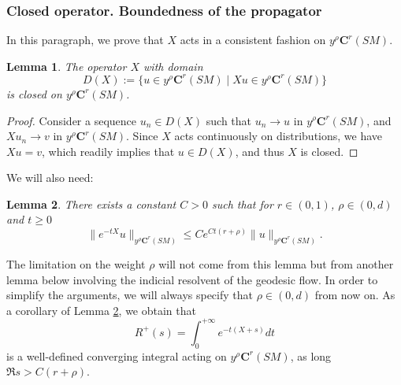 \documentclass[10pt]{amsart}
\newcommand{\bC}{\boldsymbol{C}}
\theoremstyle{plain}
\newtheorem{lemma}{Lemma}[section]
\theoremstyle{definition}
\begin{document}
\subsubsection{Closed operator. Boundedness of the propagator}

\label{sssection:boundedness}

In this paragraph, we prove that $X$ acts in a consistent fashion on $y^\rho \bC^r(SM)$.

\begin{lemma}
The operator $X$ with domain
\[
D(X):= \{ u\in y^\rho \bC^r(SM)\mid Xu \in y^\rho \bC^r(SM)\}
\]
is closed on $y^\rho \bC^r(SM)$.
\end{lemma}

\begin{proof}
Consider a sequence $u_n \in D(X)$ such that $u_n \to u$ in $y^\rho\bC^r(SM)$, and $Xu_n\to v$ in $y^\rho \bC^r(SM)$. Since $X$ acts continuously on distributions, we have $Xu = v$, which readily implies that $u\in D(X)$, and thus $X$ is closed.
\end{proof}

We will also need:

\begin{lemma}
\label{lemma:prop}
There exists a constant $C>0$ such that for $r \in (0,1)$, $\rho\in (0,d)$ and $t\geq 0$
\[
\| e^{-tX} u\|_{y^\rho\bC^r(SM)} \leq C e^{C t (r+ \rho)} \|u\|_{y^\rho \bC^r(SM)}.
\]
\end{lemma}

The limitation on the weight $\rho$ will not come from this lemma but from another lemma below involving the indicial resolvent of the geodesic flow. In order to simplify the arguments, we will always specify that $\rho \in (0,d)$ from now on. As a corollary of Lemma \ref{lemma:prop}, we obtain that
\[
R^+(s) = \int_0^{+\infty} e^{-t(X+s)} dt
\]
is a well-defined converging integral acting on $y^\rho \bC^r(SM)$, as long $\Re s > C ( r+ \rho)$.
\end{document}

